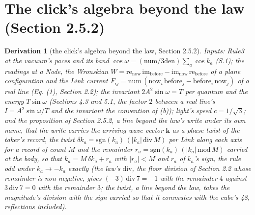 \documentclass[pdflatex,sn-mathphys-num]{sn-jnl}
\newcommand{\num}{\mathrm{num}}
\newcommand{\den}{\mathrm{den}}
\theoremstyle{thmstyleone}
\newtheorem{derivation}{Derivation}
\begin{document}
\section*{The click's algebra beyond the law (Section 2.5.2)}

\begin{derivation}[the click's algebra beyond the law, Section 2.5.2]
\emph{Inputs:} Rule3 at the vacuum's paces and its band $\cos\omega = (\num / 3\den)\sum_a \cos k_a$ (S.1); the readings at a Node, the Wronskian $W = \mathrm{re}_{\mathrm{now}}\,\mathrm{im}_{\mathrm{before}} - \mathrm{im}_{\mathrm{now}}\,\mathrm{re}_{\mathrm{before}}$ of a plane configuration and the Link current $F_{ij} = \num\,(\mathrm{now}_i\,\mathrm{before}_j - \mathrm{before}_i\,\mathrm{now}_j)$ of a real line (Eq. (1), Section 2.2); the invariant $2A^2\sin\omega = T$ per quantum and the energy $T\sin\omega$ (Sections 4.3 and 5.1, the factor $2$ between a real line's $I = A^2\sin\omega / T$ and the invariant the convention of (b)); light's speed $c = 1 / \sqrt 3$; and the proposition of Section 2.5.2, a line beyond the law's write under its own name, that the write carries the arriving wave vector $\mathbf k$ as a phase twist of the taker's record, the twist $\delta k_a = \mathrm{sgn}(k_a)\,(|k_a|\,\mathrm{div}\,M)$ per Link along each axis for a record of count $M$ and the remainder $r_a = \mathrm{sgn}(k_a)\,(|k_a|\,\mathrm{mod}\,M)$ carried at the body, so that $k_a = M\,\delta k_a + r_a$ with $|r_a| < M$ and $r_a$ of $k_a$'s sign, the rule odd under $k_a \to -k_a$ exactly (the law's $\mathrm{div}$, the floor division of Section 2.2 whose remainder is non-negative, gives $(-3)\,\mathrm{div}\,7 = -1$ with the remainder $4$ against $3\,\mathrm{div}\,7 = 0$ with the remainder $3$; the twist, a line beyond the law, takes the magnitude's division with the sign carried so that it commutes with the cube's 48, reflections included).

\end{derivation}
\end{document}
